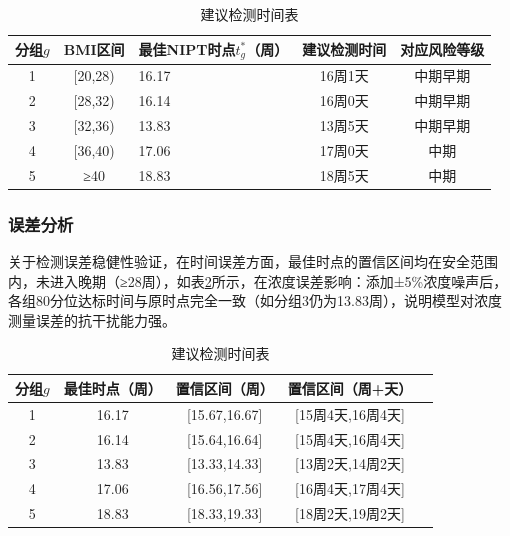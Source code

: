 \documentclass[withoutpreface,bwprint]{cumcmthesis} %
\begin{document}
\begin{table}[H]
    \centering  %
    \caption{建议检测时间表}  %
    \label{tab:建议检测时间表}  %
    \begin{threeparttable}
        \begin{tabularx}{0.94\textwidth}{c c l c c }
            \toprule[1.5pt]
            \textbf{分组$g$} & \textbf{BMI区间} & \textbf{最佳NIPT时点$t_g^*$（周）} & \textbf{建议检测时间} & \textbf{对应风险等级}\\ 
            \midrule[1pt]
            1 & [20,28)  & 16.17 & 16周1天  & 中期早期    \\
            2 & [28,32)  & 16.14 & 16周0天  & 中期早期    \\
            3 & [32,36)  & 13.83 & 13周5天  & 中期早期\\
            4 & [36,40)  & 17.06 & 17周0天  & 中期        \\
            5 & ≥40      & 18.83 & 18周5天  & 中期        \\
            \bottomrule[1.5pt]
        \end{tabularx}
    \end{threeparttable}
\end{table}

\subsubsection{误差分析}
关于检测误差稳健性验证，在时间误差方面，最佳时点的置信区间均在安全范围内，未进入晚期（≥28周），如表\ref{tab:误差检验}所示，在浓度误差影响：添加±5\%浓度噪声后，各组80分位达标时间与原时点完全一致（如分组3仍为13.83周），说明模型对浓度测量误差的抗干扰能力强。

\begin{table}[H]
    \centering  %
    \caption{建议检测时间表}  %
    \label{tab:误差检验}  %
    \begin{threeparttable}
        \begin{tabularx}{0.8\textwidth}{c c c c c }
            \toprule[1.5pt]
            \textbf{分组$g$} & \textbf{最佳时点（周）} & \textbf{置信区间（周）} & \textbf{置信区间（周+天）}\\ 
            \midrule[1pt]
            1 & 16.17 & [15.67,16.67] & [15周4天,16周4天] \\ 
            2 & 16.14 & [15.64,16.64] & [15周4天,16周4天] \\ 
            3 & 13.83 & [13.33,14.33] & [13周2天,14周2天] \\ 
            4 & 17.06 & [16.56,17.56] & [16周4天,17周4天] \\ 
            5 & 18.83 & [18.33,19.33] & [18周2天,19周2天] \\ 
            \bottomrule[1.5pt]
        \end{tabularx}
    \end{threeparttable}
\end{table}
\end{document}
